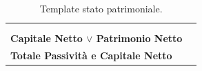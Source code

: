 \documentclass{article}
\begin{document}
\begin{table}[ht]
{\begin{tabular}{|l|c|}
                                                                                      &                     \\
                                                                                      &                     \\
            \hline
            \textbf{Capitale Netto $\lor$ Patrimonio Netto}                           &                     \\
            \hline
            \hline
            \textbf{Totale Passività e Capitale Netto}                                &                     \\
            \hline
        \end{tabular}
    }
    \caption{Template stato patrimoniale.}
\end{table}

\newpage %
\maketitle
\setlength{\extrarowheight}{5pt}%
\end{document}
